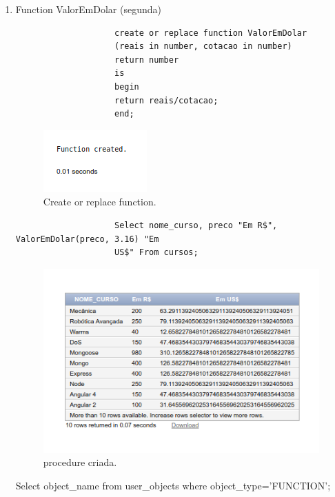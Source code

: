\documentclass[
article,			%
11pt,				%
oneside,			%
a4paper,			%
english,			%
brazil,				%
sumario=tradicional
]{abntex2}
\begin{document}
\begin{enumerate}
				\item Function ValorEmDolar (segunda)
						\begin{verbatim}
					create or replace function ValorEmDolar
					(reais in number, cotacao in number)
					return number
					is
					begin
					return reais/cotacao;
					end;
						\end{verbatim}
						\begin{center}
							\begin{figure}[H]
								\centering
								\includegraphics[scale=0.5]{./imagens/04.png}
								\caption{Create or replace function.}
								\label{rota-1}
							\end{figure}
						\end{center}
						\begin{verbatim}
					Select nome_curso, preco "Em R$", ValorEmDolar(preco, 3.16) "Em
					US$" From cursos;
				    	\end{verbatim}
				   	\begin{center}
						   	\begin{figure}[H]
						   		\centering
						   		\includegraphics[scale=0.5]{./imagens/05.png}
						   		\caption{procedure criada.}
						   		\label{rota-1}
						   	\end{figure}
				   \end{center}
			   
			   Select object\_name from user\_objects where object\_type='FUNCTION';
			   

\end{enumerate}
\end{document}
